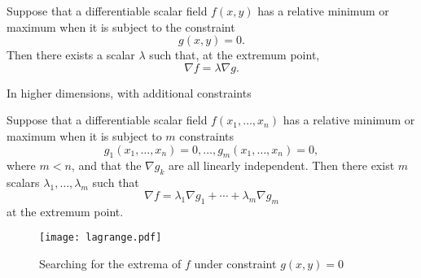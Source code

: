 \begin{theorem}
    Suppose that a differentiable scalar field \(f(x,y)\) has a relative minimum or maximum when it is subject to the constraint
    \[
        g(x,y) = 0.
    \]
    Then there exists a scalar \(\lambda\) such that, at the extremum point,
    \[
        \nabla f = \lambda \nabla g.
    \]
\end{theorem}
In higher dimensions, with additional constraints
\begin{theorem*}
    Suppose that a differentiable scalar field \(f(x_1,\ldots,x_n)\) has a relative minimum or maximum when it is subject to \(m\) constraints
    \[
        g_1(x_1,\ldots,x_n) = 0,
        \dots , g_m(x_1,\ldots,x_n)=0,
    \]
    where \(m<n\), and that the \(\nabla g_k\) are all linearly independent.
    Then there exist \(m\) scalars \(\lambda_1,\ldots,\lambda_m\) such that
    \[
        \nabla f = \lambda_1 \nabla g_1 + \cdots + \lambda_m \nabla g_m
    \]
    at the extremum point.
\end{theorem*}

\begin{figure}[htb]
    \begin{center}
        \texttt{[image: lagrange.pdf]}
        \caption{Searching for the extrema of \(f\) under constraint \(g(x,y)=0\)}
        \label{fig:lagrange}
    \end{center}
\end{figure}




